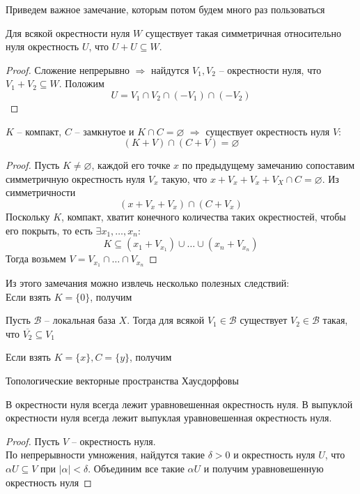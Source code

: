 \documentclass[11pt]{article}
\begin{document}
Приведем важное замечание, которым потом будем много раз пользоваться
\begin{remark}
Для всякой окрестности нуля $W$ существует такая симметричная относительно нуля окрестность $U$, что $U+U \subseteq W$.
\end{remark}
\begin{proof}
Сложение непрерывно $\Rightarrow$ найдутся $V_1, V_2$ -- окрестности нуля, что $V_1 + V_2 \subseteq W$. Положим
    $$U = V_1 \cap V_2 \cap (-V_1) \cap (-V_2)$$
\end{proof}
\begin{theorem}
 $K$ -- компакт, $C$ -- замкнутое и $K\cap C = \varnothing$ $\Rightarrow$ существует окрестность нуля $V$:
    $$(K+V) \cap (C+V) = \varnothing$$
\end{theorem}
\begin{proof}
Пусть $K \neq \varnothing$, каждой его точке $x$ по предыдущему замечанию сопоставим симметричную окрестность нуля $V_x$ такую, что $x+ V_x+V_x +V_X\cap C = \varnothing$. Из симметричности
    $$\left( x+V_x+V_x\right) \cap \left( C+V_x\right)$$
    Поскольку $K$, компакт, хватит конечного количества таких окрестностей, чтобы его покрыть, то есть $\exists x_1,\ldots, x_n$:
    $$K \subseteq \left(x_1+V_{x_1}\right) \cup \ldots \cup \left(x_n+V_{x_n}\right)$$
    Тогда возьмем $V = V_{x_1} \cap \ldots \cap V_{x_n}$
\end{proof}

Из этого замечания можно извлечь несколько полезных следствий: \\
Если взять $K = \{0\}$, получим
\begin{theorem}
    Пусть $\mathcal{B}$ -- локальная база $X$. Тогда для всякой $V_1 \in \mathcal{B}$ существует $V_2 \in \mathcal{B}$ такая, что $\overline{V_2} \subseteq V_1$
\end{theorem}
Если взять $K = \{x\}, C = \{y\}$, получим
\begin{theorem}
    Топологические векторные пространства Хаусдорфовы
\end{theorem}


\begin{theorem}\label{urav}
    В окрестности нуля всегда лежит уравновешенная окрестность нуля. В выпуклой окрестности нуля всегда лежит выпуклая уравновешенная окрестность нуля.
\end{theorem}
\begin{proof}Пусть $V$ -- окрестность нуля. \\
    По непрерывности умножения, найдутся такие $\delta > 0$ и окрестность нуля $U$, что $\alpha U \subseteq V$ при $|\alpha| < \delta$.
    Объединим все такие $\alpha U$ и получим уравновешенную окрестность нуля
\end{proof}
\end{document}
